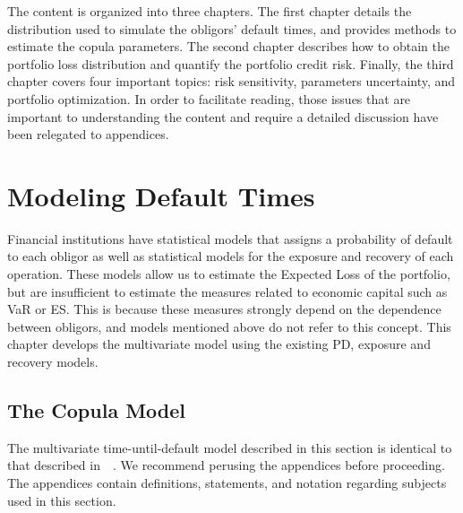 \documentclass[11pt,fleqn]{book} %
\begin{document}
The content is organized into three chapters. The first chapter details the 
distribution used to simulate the obligors' default times, and provides methods 
to estimate the copula parameters. The second chapter describes how to obtain 
the portfolio loss distribution and quantify the portfolio credit risk.
Finally, the third chapter covers four important topics: risk sensitivity, 
parameters uncertainty, and portfolio optimization.
In order to facilitate reading, those issues that are important to understanding 
the content and require a detailed discussion have been relegated to appendices.


\chapter{Modeling Default Times}
\label{chap:mdt}

Financial institutions have statistical models that assigns a probability of 
default to each obligor as well as statistical models for the exposure and 
recovery of each operation. These models allow us to estimate the Expected 
Loss of the portfolio, but are insufficient to estimate the measures related 
to economic capital such as VaR or ES. This is because these measures strongly 
depend on the dependence between obligors, and models mentioned above do not 
refer to this concept. This chapter develops the multivariate model using the 
existing PD, exposure and recovery models.

\section{The Copula Model}

The multivariate time-until-default model described in this section is identical
to that described in~\cite{li:2000,frey:2001}~\cite[chap. 2.6]{bluhm:2002}.
We recommend perusing the appendices before proceeding. The appendices contain 
definitions, statements, and notation regarding subjects used in this section.
\end{document}

